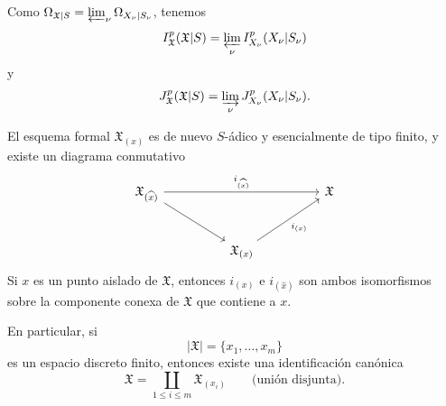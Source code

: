 Como
$\Omega_{\mathfrak X|S}=\varprojlim_\nu\Omega_{X_\nu|S_\nu}$,
tenemos
\[
\underline I_{\mathfrak X}^p(\mathfrak X|S)
=\varprojlim_\nu\underline I_{X_\nu}^p(X_\nu|S_\nu)
\]
y
\[
J_{\mathfrak X}^p(\mathfrak X|S)
=\varinjlim_\nu J_{X_\nu}^p(X_\nu|S_\nu).
\]


El esquema formal $\mathfrak X_{(x)}$ es de nuevo $S$-ádico y
esencialmente de tipo finito, y existe un diagrama conmutativo
\[
\begin{tikzcd}[column sep=huge,row sep=large]
\mathfrak X_{(\widehat{x})}
  \arrow[rr,"i_{(\widehat{x})}"] \arrow[dr]
  && \mathfrak X \\
& \mathfrak X_{(x)} \arrow[ur,"i_{(x)}"'] & {}
\end{tikzcd}
\]
Si $x$ es un punto aislado de $\mathfrak X$, entonces
$i_{(x)}$ e $i_{(\widehat{x})}$ son ambos isomorfismos sobre la
componente conexa de $\mathfrak X$ que contiene a $x$.

En particular, si
\[
|\mathfrak X|=\{x_1,\ldots,x_m\}
\]
es un espacio discreto finito, entonces existe una identificación
canónica
\[
\mathfrak X=\coprod_{1\leq i\leq m}\mathfrak X_{(x_i)}
\qquad\text{(unión disjunta)}.
\]
